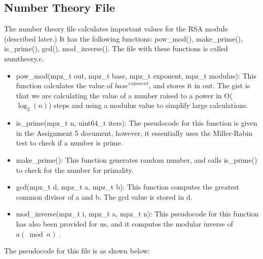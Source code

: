 \documentclass[11pt]{article}
\begin{document}
\subsection{Number Theory File}
The number theory file calculates important values for the RSA module (described later.) It has the following functions: pow\_mod(), make\_prime(), is\_prime(), gcd(), mod\_inverse(). The file with these functions is called numtheory.c.
\begin{itemize}
	\item pow\_mod(mpz\_t out, mpz\_t base, mpz\_t exponent, mpz\_t modulus): This function calculates the value of  $ {base} ^ {exponent} $, and stores it in out. The gist is that we are calculating the value of a number raised to a power in O(\( \log_{2}(n) \)) steps and using a modulus value to simplify large calculations.
    \item is\_prime(mpz\_t n, uint64\_t iters): The pseudocode for this function is given in the Assignment 5 document, however, it essentially uses the Miller-Rabin test to check if a number is prime.
    \item make\_prime(): This function generates random number, and calls is\_prime() to check for the number for primality.
    \item gcd(mpz\_t d, mpz\_t a, mpz\_t b): This function computes the greatest common divisor of a and b. The gcd value is stored in d.
    \item mod\_inverse(mpz\_t i, mpz\_t a, mpz\_t n): This pseudocode for this function has also been provided for us, and it computes the modular inverse of $a(\bmod {n})$ .
\end{itemize}
The pseudocode for this file is as shown below:
\end{document}
